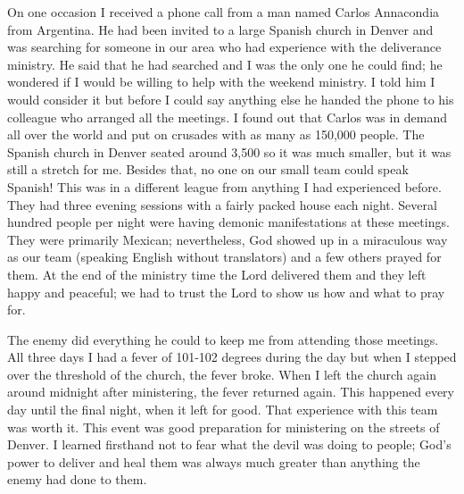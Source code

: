 \documentclass[twoside, 12pt]{book}
\begin{document}
On one occasion I received a phone call from a man named Carlos Annacondia from Argentina. He had been invited to a large Spanish church in Denver and was searching for someone in our area who had experience with the deliverance ministry. He said that he had searched and I was the only one he could find; he wondered if I would be willing to help with the weekend ministry. I told him I would consider it but before I could say anything else he handed the phone to his colleague who arranged all the meetings. I found out that Carlos was in demand all over the world and put on crusades with as many as 150,000 people. The Spanish church in Denver seated around 3,500 so it was much smaller, but it was still a stretch for me. Besides that, no one on our small team could speak Spanish! This was in a different league from anything I had experienced before. They had three evening sessions with a fairly packed house each night. Several hundred people per night were having demonic manifestations at these meetings. They were primarily Mexican; nevertheless, God showed up in a miraculous way as our team (speaking English without translators) and a few others prayed for them. At the end of the ministry time the Lord delivered them and they left happy and peaceful; we had to trust the Lord to show us how and what to pray for. 

The enemy did everything he could to keep me from attending those meetings. All three days I had a fever of 101-102 degrees during the day but when I stepped over the threshold of the church, the fever broke. When I left the church again around midnight after ministering, the fever returned again. This happened every day until the final night, when it left for good. That experience with this team was worth it. This event was good preparation for ministering on the streets of Denver. I learned firsthand not to fear what the devil was doing to people; God’s power to deliver and heal them was always much greater than anything the enemy had done to them. 
\end{document}
